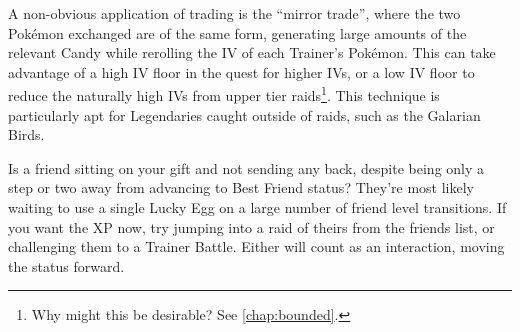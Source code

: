 A non-obvious application of trading is the ``mirror trade'', where the
 two Pokémon exchanged are of the same form, generating large amounts
 of the relevant Candy while rerolling the IV of each Trainer's Pokémon.
This can take advantage of a high IV floor in the quest for higher IVs, or
 a low IV floor to reduce the naturally high IVs from upper tier raids\footnote{Why might this be desirable? See \autoref{chap:bounded}.}.
This technique is particularly apt for Legendaries caught outside of raids,
 such as the Galarian Birds.

\begin{tipbox}[title=Forcing a friendship forward]
Is a friend sitting on your gift and not sending any back, despite being only a step
 or two away from advancing to Best Friend status?
They're most likely waiting to use a single Lucky Egg on a large number of
 friend level transitions.
If you want the XP now, try jumping into a raid of theirs from the friends list, or challenging them to a Trainer Battle.
Either will count as an interaction, moving the status forward.
\end{tipbox}

